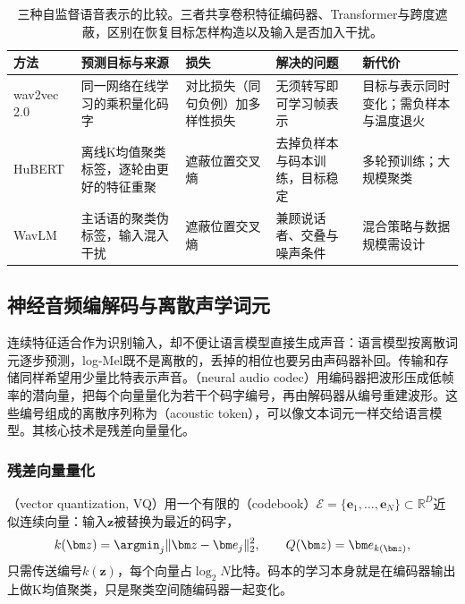 \begin{table}[htbp]
  \centering
  \small
  \begin{tabularx}{\linewidth}{@{}p{20mm}>{\raggedright\arraybackslash}X>{\raggedright\arraybackslash}X>{\raggedright\arraybackslash}X>{\raggedright\arraybackslash}X@{}}
    \toprule
    方法 & 预测目标与来源 & 损失 & 解决的问题 & 新代价\\
    \midrule
    wav2vec 2.0 & 同一网络在线学习的乘积量化码字 & 对比损失（同句负例）加多样性损失 & 无须转写即可学习帧表示 & 目标与表示同时变化；需负样本与温度退火\\
    HuBERT & 离线K均值聚类标签，逐轮由更好的特征重聚 & 遮蔽位置交叉熵 & 去掉负样本与码本训练，目标稳定 & 多轮预训练；大规模聚类\\
    WavLM & 主话语的聚类伪标签，输入混入干扰 & 遮蔽位置交叉熵 & 兼顾说话者、交叠与噪声条件 & 混合策略与数据规模需设计\\
    \bottomrule
  \end{tabularx}
  \caption{三种自监督语音表示的比较。三者共享卷积特征编码器、Transformer与跨度遮蔽，区别在恢复目标怎样构造以及输入是否加入干扰。}
  \label{tab:nlp-speech-ssl}
\end{table}

\subsection{神经音频编解码与离散声学词元}
\label{sec:nlp-speech-codec}

连续特征适合作为识别输入，却不便让语言模型直接生成声音：语言模型按离散词元逐步预测，log-Mel既不是离散的，丢掉的相位也要另由声码器补回。传输和存储同样希望用少量比特表示声音。（neural audio codec）用编码器把波形压成低帧率的潜向量，把每个向量量化为若干个码字编号，再由解码器从编号重建波形。这些编号组成的离散序列称为（acoustic token），可以像文本词元一样交给语言模型。其核心技术是残差向量量化。

\subsubsection{残差向量量化}
\label{sec:nlp-speech-rvq}

（vector quantization, VQ）用一个有限的（codebook）$\mathcal E=\{\bm e_1,\ldots,\bm e_N\}\subset\mathbb R^{D}$近似连续向量：输入$\bm z$被替换为最近的码字，
\[
 k(\bm z)=\argmin_{j}\lVert\bm z-\bm e_j\rVert_2^2,\qquad Q(\bm z)=\bm e_{k(\bm z)},
\]
只需传送编号$k(\bm z)$，每个向量占$\log_2N$比特。码本的学习本身就是在编码器输出上做K均值聚类，只是聚类空间随编码器一起变化。

